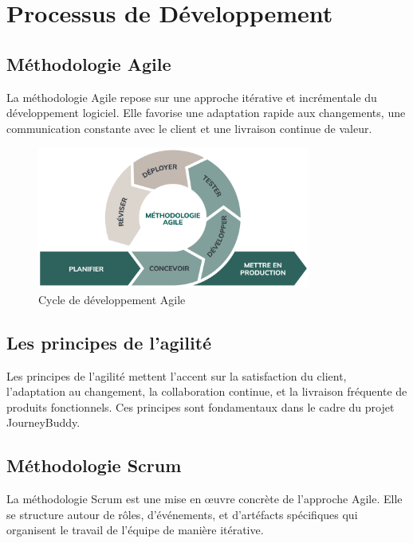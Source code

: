 \section{Processus de Développement}

\subsection{Méthodologie Agile}

La méthodologie Agile repose sur une approche itérative et incrémentale du développement logiciel. Elle favorise une adaptation rapide aux changements, une communication constante avec le client et une livraison continue de valeur.

\begin{figure}[H]
    \centering
    \includegraphics[width=0.8\textwidth]{figures/agile.png} %
    \caption{Cycle de développement Agile}
    \label{fig:agile-method}
\end{figure}

\subsection{Les principes de l’agilité}

Les principes de l’agilité mettent l’accent sur la satisfaction du client, l’adaptation au changement, la collaboration continue, et la livraison fréquente de produits fonctionnels. Ces principes sont fondamentaux dans le cadre du projet JourneyBuddy.

\subsection{Méthodologie Scrum}

La méthodologie Scrum est une mise en œuvre concrète de l’approche Agile. Elle se structure autour de rôles, d’événements, et d’artéfacts spécifiques qui organisent le travail de l’équipe de manière itérative.

